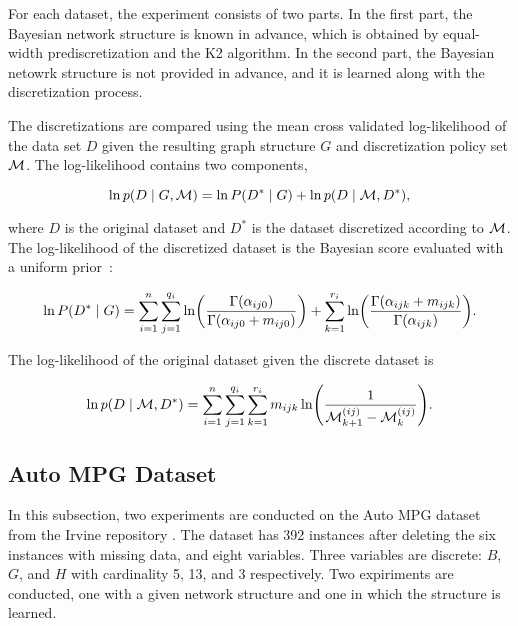 For each dataset, the experiment consists of two parts.
In the first part, the Bayesian network structure is known in advance, which is obtained by equal-width prediscretization and the K2 algorithm.
In the second part, the Bayesian netowrk structure is not provided in advance, and it is learned along with the discretization process.

The discretizations are compared using the mean cross validated log-likelihood of the data set $D$ given the resulting graph structure $G$ and discretization policy set $\mathcal{M}$.
The log-likelihood contains two components,

\begin{equation}
\ln p(D\mid G, \mathcal{M}) = \ln P(D^*\mid G) + \ln p(D\mid \mathcal{M}, D^*)\text{,}
\end{equation}

\noindent
where $D$ is the original dataset and $D^*$ is the dataset discretized according to $\mathcal{M}$.
The log-likelihood of the discretized dataset is the Bayesian score evaluated with a uniform prior~\citep{neapolitan2004learning}:

\begin{equation}
  \ln P(D^*\mid G) = \sum_{i=1}^n \sum_{j=1}^{q_i} \ln\paren{
    \frac{
      \Gamma\paren{\alpha_{ij0}}
    }{
      \Gamma\paren{\alpha_{ij0} + m_{ij0}}
    }
  } + \sum_{k=1}^{r_i} \ln\paren{
    \frac{
      \Gamma\paren{\alpha_{ijk} + m_{ijk}}
    }{
      \Gamma\paren{\alpha_{ijk}}
    }
  }\text{.}
\end{equation}


The log-likelihood of the original dataset given the discrete dataset is

\begin{equation}
  \ln p(D\mid \discset, D^*) = \sum_{i=1}^n \sum_{j=1}^{q_i} \sum_{k=1}^{r_i} m_{ijk} \ln\paren{
    \frac{
      1
    }{
      \discset^{(ij)}_{k+1} - \discset^{(ij)}_{k}
    }
  }\text{.}
\end{equation}

\subsection{Auto MPG Dataset}

In this subsection, two experiments are conducted on the Auto MPG dataset from the Irvine repository \citep{Lichman:2013}.
The dataset has \num{392} instances after deleting the six instances with missing data, and eight variables.
Three variables are discrete: $B$, $G$, and $H$ with cardinality 5, 13, and 3 respectively.
Two expiriments are conducted, one with a given network structure and one in which the structure is learned.

